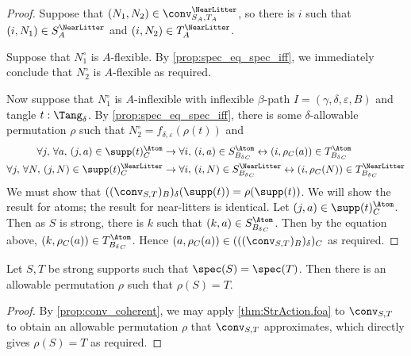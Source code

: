 \begin{proof}
  Suppose that \( (N_1, N_2) \in \conv_{S_A,T_A}^\NearLitter \), so there is \( i \) such that \( (i, N_1) \in S_A^\NearLitter \) and \( (i, N_2) \in T_A^\NearLitter \).

  Suppose that \( N_1^\circ \) is \( A \)-flexible.
  By \cref{prop:spec_eq_spec_iff}, we immediately conclude that \( N_2^\circ \) is \( A \)-flexible as required.

  Now suppose that \( N_1^\circ \) is \( A \)-inflexible with inflexible \( \beta \)-path \( I = (\gamma,\delta,\varepsilon,B) \) and tangle \( t : \Tang_\delta \).
  By \cref{prop:spec_eq_spec_iff}, there is some \( \delta \)-allowable permutation \( \rho \) such that \( N_2^\circ = f_{\delta,\varepsilon}(\rho(t)) \) and
  \begin{align*}
    \forall j,\, \forall a,\, (j, a) \in \supp(t)_C^\Atom &\to \forall i,\, (i, a) \in S_{{B_\delta}_C}^\Atom \leftrightarrow (i, \rho_C(a)) \in T_{{B_\delta}_C}^\Atom \\
    \forall j,\, \forall N,\, (j, N) \in \supp(t)_C^\NearLitter &\to \forall i,\, (i, N) \in S_{{B_\delta}_C}^\NearLitter \leftrightarrow (i, \rho_C(N)) \in T_{{B_\delta}_C}^\NearLitter
  \end{align*}
  We must show that \( ((\conv_{S,T})_B)_\delta(\supp(t)) = \rho(\supp(t)) \).
  We will show the result for atoms; the result for near-litters is identical.
  Let \( (j, a) \in \supp(t)_C^\Atom \).
  Then as \( S \) is strong, there is \( k \) such that \( (k, a) \in S_{{B_\delta}_C}^\Atom \).
  Then by the equation above, \( (k, \rho_C(a)) \in T_{{B_\delta}_C}^\Atom \).
  Hence \( (a, \rho_C(a)) \in (((\conv_{S,T})_B)_\delta)_C \) as required.
\end{proof}
\begin{proposition}
  \label{prop:exists_allowable_of_spec_eq_spec}
  Let \( S, T \) be strong supports such that \( \spec(S) = \spec(T) \).
  Then there is an allowable permutation \( \rho \) such that \( \rho(S) = T \).
\end{proposition}
\begin{proof}
  By \cref{prop:conv_coherent}, we may apply \cref{thm:StrAction.foa} to \( \conv_{S,T} \) to obtain an allowable permutation \( \rho \) that \( \conv_{S,T} \) approximates, which directly gives \( \rho(S) = T \) as required.
\end{proof}

